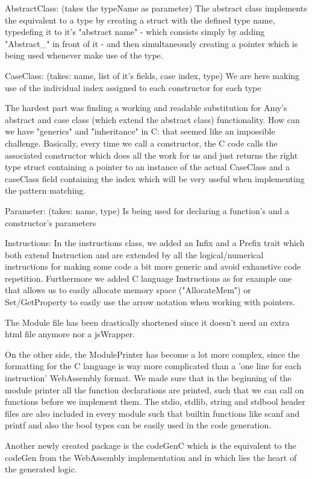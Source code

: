 AbstractClass: (takes the typeName as parameter)
The abstract class implements the equivalent to a type by creating a struct with the defined type name, typedefing it to
it's "abstract name" - which consists simply by adding "Abstract\_" in front of it - and then simultaneously creating a pointer
which is being used whenever make use of the type.

CaseClass: (takes: name, list of it's fields, case index, type)
We are here making use of the individual index assigned to each constructor for each type

The hardest part was finding a working and readable substitution for Amy's abstract and case class (which extend the abstract class) functionality.
How can we have "generics" and "inheritance" in C: that seemed like an impossible challenge.
Basically, every time we call a constructor, the C code calls the associated constructor which does all the work for us and
just returns the right type struct containing a pointer to an instance of the actual CaseClass and a caseClass field containing
the index which will be very useful when implementing the pattern matching.

Parameter: (takes: name, type)
Is being used for declaring a function's and a constructor's parameters

Instructions:
In the instructions class, we added an Infix and a Prefix trait which both extend Instruction and are extended by all the
logical/numerical instructions for making some code a bit more generic and avoid exhaustive code repetition.
Furthermore we added C language Instructions as for example one that allows us to easily allocate memory space ("AllocateMem")
or Set/GetProperty to easily use the arrow notation when working with pointers.

The Module file has been drastically shortened since it doesn't need an extra html file anymore nor a jsWrapper.

On the other side, the ModulePrinter has become a lot more complex, since the formatting for the C language is way more
complicated than a 'one line for each instruction' WebAssembly format.
We made sure that in the beginning of the module printer all the function declarations are printed, such that we can call
on functions before we implement them.
The stdio, stdlib, string and stdbool header files are also included in every module such that builtin functions like scanf
and printf and also the bool types can be easily used in the code generation.

Another newly created package is the codeGenC which is the equivalent to the codeGen from the WebAssembly implementation
and in which lies the heart of the generated logic.

